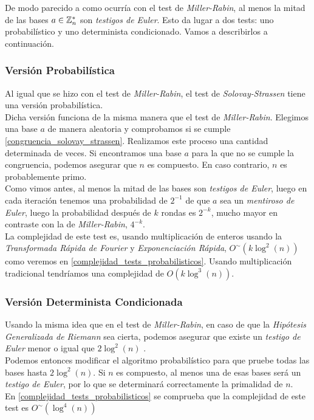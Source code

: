 De modo parecido a como ocurría con el test de \textit{Miller-Rabin}, al menos la mitad de las bases $a \in \mathbb{Z}_n^*$ son \textit{testigos de Euler}. Esto da lugar a dos tests: uno probabilístico y uno determinista condicionado. Vamos a describirlos a continuación.

\subsubsection{Versión Probabilística}

Al igual que se hizo con el test de \textit{Miller-Rabin}, el test de \textit{Solovay-Strassen} tiene una versión probabilística.\\

Dicha versión funciona de la misma manera que el test de \textit{Miller-Rabin}. Elegimos una base $a$ de manera aleatoria y comprobamos si se cumple \eqref{congruencia_solovay_strassen}. Realizamos este proceso una cantidad determinada de veces. Si encontramos una base $a$ para la que no se cumple la congruencia, podemos asegurar que $n$ es compuesto. En caso contrario, $n$ es probablemente primo.\\

Como vimos antes, al menos la mitad de las bases son \textit{testigos de Euler}, luego en cada iteración tenemos una probabilidad de $2^{-1}$ de que $a$ sea un \textit{mentiroso de Euler}, luego la probabilidad después de $k$ rondas es $2^{-k}$, mucho mayor en contraste con la de \textit{Miller-Rabin}, $4^{-k}$.\\

La complejidad de este test es, usando multiplicación de enteros usando la \textit{Transformada Rápida de Fourier} y \textit{Exponenciación Rápida}, $O^\sim(k\log^2(n))$ como veremos en \autoref{complejidad_tests_probabilisticos}. Usando multiplicación tradicional tendríamos una complejidad de $O(k\log^3(n))$.

\subsubsection{Versión Determinista Condicionada}

Usando la misma idea que en el test de \textit{Miller-Rabin}, en caso de que la \textit{Hipótesis Generalizada de Riemann} sea cierta, podemos asegurar que existe un \textit{testigo de Euler} menor o igual que $2\log^2(n)$ \cite{bach_1990}.\\

Podemos entonces modificar el algoritmo probabilístico para que pruebe todas las bases hasta $2\log^2(n)$. Si $n$ es compuesto, al menos una de esas bases será un \textit{testigo de Euler}, por lo que se determinará correctamente la primalidad de $n$.\\

En \autoref{complejidad_tests_probabilisticos} se comprueba que la complejidad de este test es $O^\sim(\log^4(n))$

\endinput
